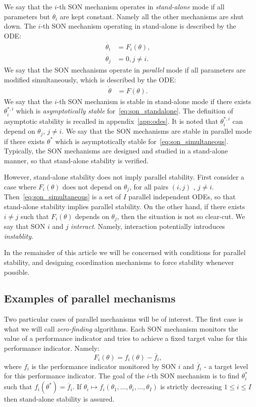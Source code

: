 \documentclass[10pt,conference,letterpaper]{IEEEtran}
\begin{document}
	We say that the $i$-th \ac{SON} mechanism operates in \emph{stand-alone} mode if all parameters but $\theta_i$ are kept constant. Namely all the other mechanisms are shut down. The $i$-th \ac{SON} mechanism operating in stand-alone is described by the \ac{ODE}:
\begin{align}\label{eq:son_standalone}
	\dot{ \theta_i } &= F_i(\theta), \nonumber\\
	\dot{ \theta_j } &= 0 , j \neq i.
\end{align}
	We say that the \ac{SON} mechanisms operate in \emph{parallel} mode if all parameters are modified simultaneously, which is described by the \ac{ODE}:
\begin{align}\label{eq:son_simultaneous}
	\dot{ \theta } &= F(\theta).
\end{align}
 	We say that the $i$-th \ac{SON} mechanism is stable in stand-alone mode if there exists $\theta^{*,i}_i$ which is \emph{asymptotically stable} for~\eqref{eq:son_standalone}. The definition of asymptotic stability is recalled in appendix~\ref{app:odes}. It is noted that $\theta^{*,i}_i$ can depend on $\theta_j$, $j \neq i$. We say that the \ac{SON} mechanisms are stable in parallel mode if there exists $\theta^*$ which is asymptotically stable for~\eqref{eq:son_simultaneous}. Typically, the \ac{SON} mechanisms are designed and studied in a stand-alone manner, so that stand-alone stability is verified. 
	
	However, stand-alone stability does not imply parallel stability. First consider a case where $F_i(\theta)$ does not depend on $\theta_j$, for all pairs $(i,j)$ , $j \neq i$. Then~\eqref{eq:son_simultaneous} is a set of $I$ parallel independent \acp{ODE}, so that stand-alone stability implies parallel stability. On the other hand, if there exists $i \neq j$ such that $F_i(\theta)$ depends on $\theta_j$, then the situation is not so clear-cut. We say that \ac{SON} $i$ and $j$ \emph{interact}. Namely, interaction potentially introduces \emph{instablity}.
	
	In the remainder of this article we will be concerned with conditions for parallel stability, and designing coordination mechanisms to force stability whenever possible.
\subsection{Examples of parallel mechanisms}
	Two particular cases of parallel mechanisms will be of interest. The first case is what we will call \emph{zero-finding} algorithms. Each \ac{SON} mechanism monitors the value of a performance indicator and tries to achieve a fixed target value for this performance indicator. Namely:
\begin{equation}\label{eq:son_target}
	F_i(\theta) =  f_i(\theta) - \overline{f}_i,
\end{equation}
	where $f_i$ is the performance indicator monitored by \ac{SON} $i$ and $\overline{f}_i$ - a target level for this performance indicator. The goal of the $i$-th \ac{SON} mechanism is to find $\theta_i^*$ such that $f_i(\theta^*) = \overline{f}_i$. If $\theta_i \mapsto f_i(\theta_1,\dotsc,\theta_i,\dotsc,\theta_I)$ is strictly decreasing $1 \leq i \leq I$ then stand-alone stability is assured. 
\end{document}
